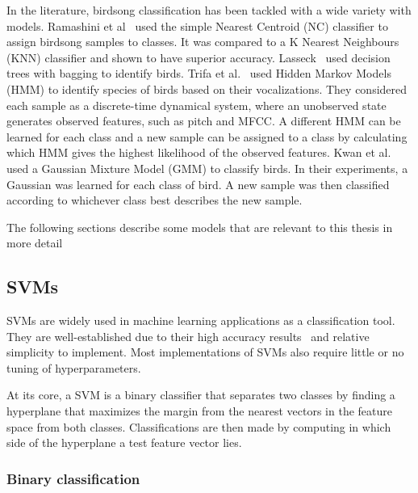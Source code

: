 In the literature, birdsong classification has been tackled with a wide variety
with models. Ramashini et al~\cite{ramashini2019bird} used the simple Nearest
Centroid (NC) classifier to assign birdsong samples to classes. It was compared
to a K Nearest Neighbours (KNN) classifier and shown to have superior accuracy.
Lasseck~\cite{lasseck2015improved} used decision trees with bagging to identify
birds. Trifa et al.~\cite{trifa2008automated} used Hidden Markov Models (HMM) to
identify species of birds based on their vocalizations. They considered each
sample as a discrete-time dynamical system, where an unobserved state generates
observed features, such as pitch and MFCC\@. A different HMM can be learned for
each class and a new sample can be assigned to a class by calculating which HMM
gives the highest likelihood of the observed features. Kwan et
al.~\cite{kwan2006automated} used a Gaussian Mixture Model (GMM) to classify
birds. In their experiments, a Gaussian was learned for each class of bird. A
new sample was then classified according to whichever class best describes the
new sample.

The following sections describe some models that are relevant to this thesis in
more detail

\subsection{SVMs}

SVMs are widely used in machine learning applications as a classification tool.
They are well-established due to their high accuracy
results~\cite{fagerlund2007bird} and relative simplicity to implement. Most
implementations of SVMs also require little or no tuning of hyperparameters.

At its core, a SVM is a binary classifier that separates two classes by finding
a hyperplane that maximizes the margin from the nearest vectors in the feature
space from both classes. Classifications are then made by computing in which
side of the hyperplane a test feature vector lies.

\subsubsection{Binary classification}


